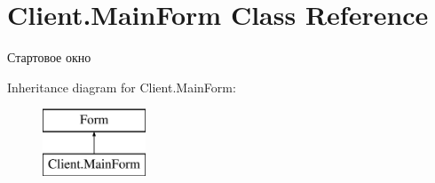 \hypertarget{class_client_1_1_main_form}{}\section{Client.\+Main\+Form Class Reference}
\label{class_client_1_1_main_form}


Стартовое окно  


Inheritance diagram for Client.\+Main\+Form\+:\begin{figure}[H]
\begin{center}
\leavevmode
\includegraphics[height=2.000000cm]{class_client_1_1_main_form}
\end{center}
\end{figure}
